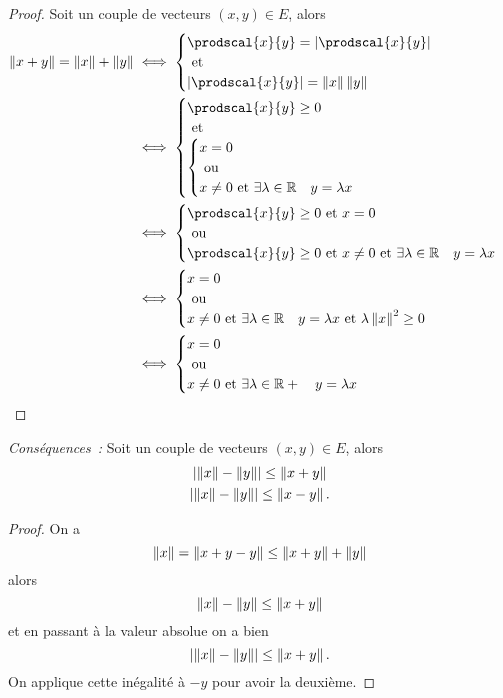 \begin{proof}
  Soit un couple de  vecteurs $(x,y) \in E$, alors
  \begin{align}
    \norme{x+y} = \norme{x}+\norme{y} &\iff \begin{cases} \prodscal{x}{y} = \abs{\prodscal{x}{y}} \\ \text{~et~} \\ \abs{\prodscal{x}{y}} = \norme{x}\norme{y}\end{cases} \\
    &\iff  \begin{cases}  \prodscal{x}{y} \geq 0 \\ \text{~et~} \\ \begin{cases} x=0 \\ \text{~ou~} \\ x\neq 0 \text{~et~} \exists \lambda \in \R \quad y=\lambda x\end{cases} \end{cases}\\
    & \iff \begin{cases} \prodscal{x}{y} \geq 0 \text{~et~} x =0 \\ \text{~ou~} \\  \prodscal{x}{y} \geq 0 \text{~et~} x \neq 0 \text{~et~} \exists \lambda \in \R \quad y=\lambda x \end{cases}\\
    & \iff \begin{cases} x=0 \\ \text{~ou~} \\ x \neq 0 \text{~et~} \exists \lambda \in \R \quad y=\lambda x \text{~et~} \lambda\norme{x}^2 \geq 0 \end{cases} \\
      & \iff \begin{cases} x=0 \\ \text{~ou~} \\ x \neq 0 \text{~et~} \exists \lambda \in \R+ \quad y=\lambda x \end{cases}
  \end{align}
\end{proof}

\emph{Conséquences~:} Soit un couple de  vecteurs $(x,y) \in E$, alors
\begin{gather}
  \left\lvert\left\lVert x\right\rVert-\left\lVert y\right\rVert\right\rvert \leq \left\lVert x+y\right\rVert\\
  \left\lvert\left\lVert x\right\rVert-\left\lVert y\right\rVert\right\rvert \leq \left\lVert x-y\right\rVert.
\end{gather}
\begin{proof}
  On a
  \begin{equation}
    \left\lVert x\right\rVert = \left\lVert x+y-y\right\rVert \leq \left\lVert x+y\right\rVert +\left\lVert y\right\rVert
  \end{equation}
  alors
  \begin{equation}
    \left\lVert x\right\rVert - \left\lVert y\right\rVert \leq \left\lVert x+y\right\rVert
  \end{equation}
  et en passant à la valeur absolue on a bien
  \begin{equation}
    \left\lvert\left\lVert x\right\rVert-\left\lVert y\right\rVert\right\rvert \leq \left\lVert x+y\right\rVert.
  \end{equation}
  On applique cette inégalité à $-y$ pour avoir la deuxième.
\end{proof}

